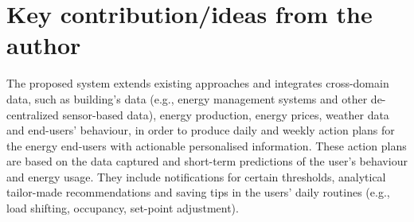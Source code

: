 \documentclass{report}
\begin{document}
    
    
    \section*{Key contribution/ideas from the author}
    The proposed system extends existing approaches and integrates cross-domain data, such as
building’s data (e.g., energy management systems and other de-centralized sensor-based data), energy production, energy prices, weather data and end-users’ behaviour, in order to produce daily and weekly action plans for the energy end-users with actionable personalised information. These action plans are based on the data captured and short-term predictions of the user’s behaviour and energy usage. They include notifications for certain thresholds, analytical tailor-made recommendations and saving tips in the users’ daily routines (e.g., load shifting, occupancy, set-point adjustment).
\end{document}
